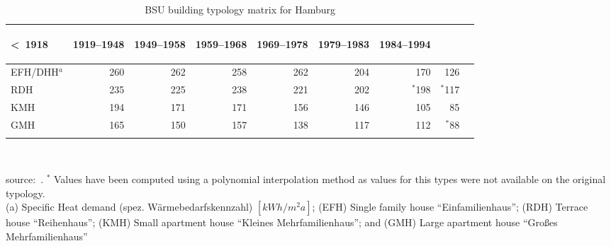 \begin{table}[htbp]
  \centering
  \caption{BSU building typology matrix for Hamburg }
  \label{tab:HH}%
    \begin{tabular}{l r rrr rrr r}
    \addlinespace
    \toprule
    \begin{sideways}\textless~1918\end{sideways}&  %
    \begin{sideways}1919--1948\end{sideways}&     %
    \begin{sideways}1949--1958\end{sideways}&     %
    \begin{sideways}1959--1968\end{sideways}&     %
    \begin{sideways}1969--1978\end{sideways}&     %
    \begin{sideways}1979--1983\end{sideways}&     %
    \begin{sideways}1984--1994\end{sideways}\\    %
    \midrule
EFH/DHH$^a$  &260 &262 &258 &262 &204 &170 & 126 \\
RDH          &235 &225 &238 &221 &202 &$^{*}$198& $^{*}$117 \\
KMH          &194 &171 &171 &156 &146 &105 & 85 \\
GMH          &165 &150 &157 &138 &117 &112 & $^{*}$88 \\
    \bottomrule
    \addlinespace
    \end{tabular}\\
    \begin{footnotesize}
        source:~\cite{BSU.2011}.
    $^{*}$ Values have been computed using a polynomial interpolation method as 
values for this types were not available on the original typology.\\
    (a) Specific Heat demand (spez. W\"armebedarfskennzahl)
    $[kWh/m^{2}a]$;
(EFH) Single family house ``Einfamilienhaus'';
(RDH) Terrace house ``Reihenhaus'';
(KMH) Small apartment house ``Kleines Mehrfamilienhaus''; and
(GMH) Large apartment house ``Großes Mehrfamilienhaus''\\
    \end{footnotesize}
\end{table}

